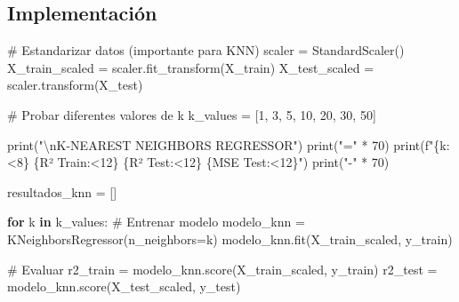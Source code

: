 \documentclass[
  doc,
  floatsintext,
  longtable,
  a4paper,
  nolmodern,
  notxfonts,
  notimes,
  12pt,
  colorlinks=true,linkcolor=blue,citecolor=blue,urlcolor=blue]{apa7}
\newenvironment{Shaded}{\begin{snugshade}}{\end{snugshade}}
\newcommand{\BuiltInTok}[1]{\textcolor[rgb]{0.00,0.23,0.31}{#1}}
\newcommand{\CharTok}[1]{\textcolor[rgb]{0.13,0.47,0.30}{#1}}
\newcommand{\CommentTok}[1]{\textcolor[rgb]{0.37,0.37,0.37}{#1}}
\newcommand{\ControlFlowTok}[1]{\textcolor[rgb]{0.00,0.23,0.31}{\textbf{#1}}}
\newcommand{\DecValTok}[1]{\textcolor[rgb]{0.68,0.00,0.00}{#1}}
\newcommand{\KeywordTok}[1]{\textcolor[rgb]{0.00,0.23,0.31}{\textbf{#1}}}
\newcommand{\NormalTok}[1]{\textcolor[rgb]{0.00,0.23,0.31}{#1}}
\newcommand{\OperatorTok}[1]{\textcolor[rgb]{0.37,0.37,0.37}{#1}}
\newcommand{\SpecialCharTok}[1]{\textcolor[rgb]{0.37,0.37,0.37}{#1}}
\newcommand{\SpecialStringTok}[1]{\textcolor[rgb]{0.13,0.47,0.30}{#1}}
\newcommand{\StringTok}[1]{\textcolor[rgb]{0.13,0.47,0.30}{#1}}
\begin{document}
\subsection{Implementación}\label{implementaciuxf3n-5}

\begin{Shaded}
\begin{Highlighting}[]
\CommentTok{\# Estandarizar datos (importante para KNN)}
\NormalTok{scaler }\OperatorTok{=}\NormalTok{ StandardScaler()}
\NormalTok{X\_train\_scaled }\OperatorTok{=}\NormalTok{ scaler.fit\_transform(X\_train)}
\NormalTok{X\_test\_scaled }\OperatorTok{=}\NormalTok{ scaler.transform(X\_test)}

\CommentTok{\# Probar diferentes valores de k}
\NormalTok{k\_values }\OperatorTok{=}\NormalTok{ [}\DecValTok{1}\NormalTok{, }\DecValTok{3}\NormalTok{, }\DecValTok{5}\NormalTok{, }\DecValTok{10}\NormalTok{, }\DecValTok{20}\NormalTok{, }\DecValTok{30}\NormalTok{, }\DecValTok{50}\NormalTok{]}

\BuiltInTok{print}\NormalTok{(}\StringTok{"}\CharTok{\textbackslash{}n}\StringTok{K{-}NEAREST NEIGHBORS REGRESSOR"}\NormalTok{)}
\BuiltInTok{print}\NormalTok{(}\StringTok{"="} \OperatorTok{*} \DecValTok{70}\NormalTok{)}
\BuiltInTok{print}\NormalTok{(}\SpecialStringTok{f"}\SpecialCharTok{\{}\StringTok{\textquotesingle{}k\textquotesingle{}}\SpecialCharTok{:\textless{}8\}}\SpecialStringTok{ }\SpecialCharTok{\{}\StringTok{\textquotesingle{}R² Train\textquotesingle{}}\SpecialCharTok{:\textless{}12\}}\SpecialStringTok{ }\SpecialCharTok{\{}\StringTok{\textquotesingle{}R² Test\textquotesingle{}}\SpecialCharTok{:\textless{}12\}}\SpecialStringTok{ }\SpecialCharTok{\{}\StringTok{\textquotesingle{}MSE Test\textquotesingle{}}\SpecialCharTok{:\textless{}12\}}\SpecialStringTok{"}\NormalTok{)}
\BuiltInTok{print}\NormalTok{(}\StringTok{"{-}"} \OperatorTok{*} \DecValTok{70}\NormalTok{)}

\NormalTok{resultados\_knn }\OperatorTok{=}\NormalTok{ []}

\ControlFlowTok{for}\NormalTok{ k }\KeywordTok{in}\NormalTok{ k\_values:}
    \CommentTok{\# Entrenar modelo}
\NormalTok{    modelo\_knn }\OperatorTok{=}\NormalTok{ KNeighborsRegressor(n\_neighbors}\OperatorTok{=}\NormalTok{k)}
\NormalTok{    modelo\_knn.fit(X\_train\_scaled, y\_train)}
    
    \CommentTok{\# Evaluar}
\NormalTok{    r2\_train }\OperatorTok{=}\NormalTok{ modelo\_knn.score(X\_train\_scaled, y\_train)}
\NormalTok{    r2\_test }\OperatorTok{=}\NormalTok{ modelo\_knn.score(X\_test\_scaled, y\_test)}
    

\end{Highlighting}
\end{Shaded}
\end{document}
